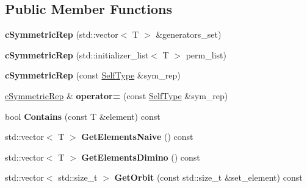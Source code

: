 \subsection*{\-Public \-Member \-Functions}
\begin{DoxyCompactItemize}
\item 
\hypertarget{classcSymmetricRep_a64f4c25b8f5aebbd78f49f3485aed88f}{
{\bfseries c\-Symmetric\-Rep} (std\-::vector$<$ \-T $>$ \&generators\-\_\-set)}
\label{classcSymmetricRep_a64f4c25b8f5aebbd78f49f3485aed88f}

\item 
\hypertarget{classcSymmetricRep_a47ba133fe6f1ba2b8d3da5ae6cb001d9}{
{\bfseries c\-Symmetric\-Rep} (std\-::initializer\-\_\-list$<$ \-T $>$ perm\-\_\-list)}
\label{classcSymmetricRep_a47ba133fe6f1ba2b8d3da5ae6cb001d9}

\item 
\hypertarget{classcSymmetricRep_a5fa8e9aabcacfddbf5f8d896a9bf6c94}{
{\bfseries c\-Symmetric\-Rep} (const \hyperlink{classcSymmetricRep}{\-Self\-Type} \&sym\-\_\-rep)}
\label{classcSymmetricRep_a5fa8e9aabcacfddbf5f8d896a9bf6c94}

\item 
\hypertarget{classcSymmetricRep_a42ce2132ef0a6c51f7afc4496c121cbe}{
\hyperlink{classcSymmetricRep}{c\-Symmetric\-Rep} \& {\bfseries operator=} (const \hyperlink{classcSymmetricRep}{\-Self\-Type} \&sym\-\_\-rep)}
\label{classcSymmetricRep_a42ce2132ef0a6c51f7afc4496c121cbe}

\item 
\hypertarget{classcSymmetricRep_a60f095284b40e494a34fda76e1fc7ecd}{
bool {\bfseries \-Contains} (const \-T \&element) const }
\label{classcSymmetricRep_a60f095284b40e494a34fda76e1fc7ecd}

\item 
\hypertarget{classcSymmetricRep_a935cec1dbd90a09581f1aa7f150eb9de}{
std\-::vector$<$ \-T $>$ {\bfseries \-Get\-Elements\-Naive} () const }
\label{classcSymmetricRep_a935cec1dbd90a09581f1aa7f150eb9de}

\item 
\hypertarget{classcSymmetricRep_ad9f112b996c14824bd1d669aed162cbf}{
std\-::vector$<$ \-T $>$ {\bfseries \-Get\-Elements\-Dimino} () const }
\label{classcSymmetricRep_ad9f112b996c14824bd1d669aed162cbf}

\item 
\hypertarget{classcSymmetricRep_a62cbd7057456f503eec43d592497e94f}{
std\-::vector$<$ std\-::size\-\_\-t $>$ {\bfseries \-Get\-Orbit} (const std\-::size\-\_\-t \&set\-\_\-element) const }
\label{classcSymmetricRep_a62cbd7057456f503eec43d592497e94f}


\end{DoxyCompactItemize}
